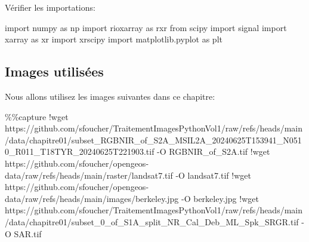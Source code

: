 \documentclass[
  11pt,
  letterpaper,
  open=any,
  twoside=false,
  french]{scrbook}
\newenvironment{Shaded}{\begin{snugshade}}{\end{snugshade}}
\newcommand{\ImportTok}[1]{\textcolor[rgb]{0.00,0.46,0.62}{#1}}
\newcommand{\NormalTok}[1]{\textcolor[rgb]{0.00,0.23,0.31}{#1}}
\newcommand{\OperatorTok}[1]{\textcolor[rgb]{0.37,0.37,0.37}{#1}}
\begin{document}
Vérifier les importations:

\begin{Shaded}
\begin{Highlighting}[]
\ImportTok{import}\NormalTok{ numpy }\ImportTok{as}\NormalTok{ np}
\ImportTok{import}\NormalTok{ rioxarray }\ImportTok{as}\NormalTok{ rxr}
\ImportTok{from}\NormalTok{ scipy }\ImportTok{import}\NormalTok{ signal}
\ImportTok{import}\NormalTok{ xarray }\ImportTok{as}\NormalTok{ xr}
\ImportTok{import}\NormalTok{ xrscipy}
\ImportTok{import}\NormalTok{ matplotlib.pyplot }\ImportTok{as}\NormalTok{ plt}
\end{Highlighting}
\end{Shaded}

\subsection{Images utilisées}\label{images-utilisuxe9es-3}

Nous allons utilisez les images suivantes dans ce chapitre:

\begin{Shaded}
\begin{Highlighting}[]
\OperatorTok{\%\%}\NormalTok{capture}
\OperatorTok{!}\NormalTok{wget https:}\OperatorTok{//}\NormalTok{github.com}\OperatorTok{/}\NormalTok{sfoucher}\OperatorTok{/}\NormalTok{TraitementImagesPythonVol1}\OperatorTok{/}\NormalTok{raw}\OperatorTok{/}\NormalTok{refs}\OperatorTok{/}\NormalTok{heads}\OperatorTok{/}\NormalTok{main}\OperatorTok{/}\NormalTok{data}\OperatorTok{/}\NormalTok{chapitre01}\OperatorTok{/}\NormalTok{subset\_RGBNIR\_of\_S2A\_MSIL2A\_20240625T153941\_N0510\_R011\_T18TYR\_20240625T221903.tif }\OperatorTok{{-}}\NormalTok{O RGBNIR\_of\_S2A.tif}
\OperatorTok{!}\NormalTok{wget https:}\OperatorTok{//}\NormalTok{github.com}\OperatorTok{/}\NormalTok{sfoucher}\OperatorTok{/}\NormalTok{opengeos}\OperatorTok{{-}}\NormalTok{data}\OperatorTok{/}\NormalTok{raw}\OperatorTok{/}\NormalTok{refs}\OperatorTok{/}\NormalTok{heads}\OperatorTok{/}\NormalTok{main}\OperatorTok{/}\NormalTok{raster}\OperatorTok{/}\NormalTok{landsat7.tif }\OperatorTok{{-}}\NormalTok{O landsat7.tif}
\OperatorTok{!}\NormalTok{wget https:}\OperatorTok{//}\NormalTok{github.com}\OperatorTok{/}\NormalTok{sfoucher}\OperatorTok{/}\NormalTok{opengeos}\OperatorTok{{-}}\NormalTok{data}\OperatorTok{/}\NormalTok{raw}\OperatorTok{/}\NormalTok{refs}\OperatorTok{/}\NormalTok{heads}\OperatorTok{/}\NormalTok{main}\OperatorTok{/}\NormalTok{images}\OperatorTok{/}\NormalTok{berkeley.jpg }\OperatorTok{{-}}\NormalTok{O berkeley.jpg}
\OperatorTok{!}\NormalTok{wget https:}\OperatorTok{//}\NormalTok{github.com}\OperatorTok{/}\NormalTok{sfoucher}\OperatorTok{/}\NormalTok{TraitementImagesPythonVol1}\OperatorTok{/}\NormalTok{raw}\OperatorTok{/}\NormalTok{refs}\OperatorTok{/}\NormalTok{heads}\OperatorTok{/}\NormalTok{main}\OperatorTok{/}\NormalTok{data}\OperatorTok{/}\NormalTok{chapitre01}\OperatorTok{/}\NormalTok{subset\_0\_of\_S1A\_split\_NR\_Cal\_Deb\_ML\_Spk\_SRGR.tif }\OperatorTok{{-}}\NormalTok{O SAR.tif}
\end{Highlighting}
\end{Shaded}
\end{document}
